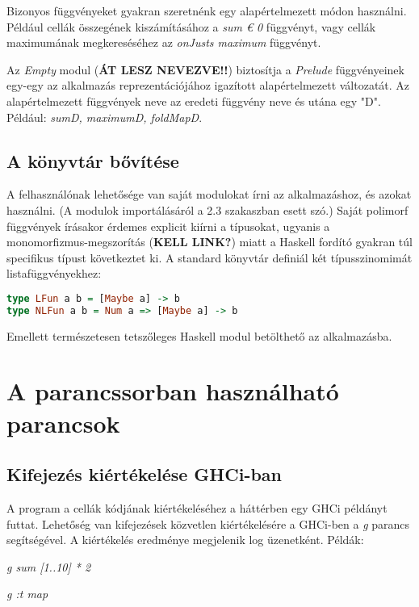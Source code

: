 Bizonyos függvényeket gyakran szeretnénk egy alapértelmezett módon használni. Például cellák összegének kiszámításához a \textit{sum € 0} függvényt, vagy cellák maximumának megkereséséhez az \textit{onJusts maximum} függvényt.

Az \textit{Empty} modul (\textbf{ÁT LESZ NEVEZVE!!}) biztosítja a \textit{Prelude} függvényeinek egy-egy az alkalmazás reprezentációjához igazított alapértelmezett változatát. Az alapértelmezett függvények neve az eredeti függvény neve és utána egy "D". Például: \textit{sumD, maximumD, foldMapD}.

\subsection{A könyvtár bővítése}

A felhasználónak lehetősége van saját modulokat írni az alkalmazáshoz, és azokat használni. (A modulok importálásáról a 2.3 szakaszban esett szó.) Saját polimorf függvények írásakor érdemes explicit kiírni a típusokat, ugyanis a monomorfizmus-megszorítás (\textbf{KELL LINK?}) miatt a Haskell fordító gyakran túl specifikus típust következtet ki. A standard könyvtár definiál két típusszinomimát listafüggvényekhez:

\begin{lstlisting}[caption={LFun és NLFun}, language={Haskell},label=src:lfun]
type LFun a b = [Maybe a] -> b
type NLFun a b = Num a => [Maybe a] -> b
\end{lstlisting}

Emellett természetesen tetszőleges Haskell modul betölthető az alkalmazásba.

\section{A parancssorban használható parancsok}

\subsection{Kifejezés kiértékelése GHCi-ban}

A program a cellák kódjának kiértékeléséhez a háttérben egy GHCi példányt futtat. Lehetőség van kifejezések közvetlen kiértékelésére a GHCi-ben a \textit{g} parancs segítségével. A kiértékelés eredménye megjelenik log üzenetként. Példák:
\begin{compactenum}
	\item \textit{g sum [1..10] * 2}
	\item \textit{g :t map}
\end{compactenum}

